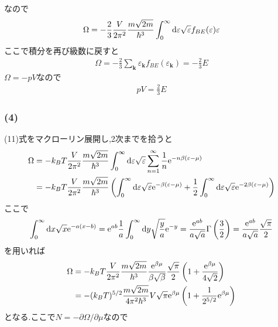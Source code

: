なので
\begin{align}
  \Omega=-\frac{2}{3}\frac{V}{2\pi^2}\frac{m\sqrt{2m}}{\hbar^3}\int_0^\infty{\rm d}\varepsilon\sqrt{\varepsilon}f_{BE}(\varepsilon)\varepsilon
\end{align}
ここで積分を再び級数に戻すと
\begin{align}
  \Omega=-\frac{2}{3}\sum_{\bm k}\varepsilon_{\bm k}f_{BE}(\varepsilon_{\bm k})=-\frac{2}{3}E
\end{align}
$\Omega=-pV$なので
\begin{align}
  pV=\frac{2}{3}E
\end{align}
\subsubsection*{(4)}
(11)式をマクローリン展開し,2次までを拾うと
\begin{align}
  \begin{split}
    \Omega&=-k_BT\frac{V}{2\pi^2}\frac{m\sqrt{2m}}{\hbar^3}\int^\infty_0{\rm d}\varepsilon\sqrt{\varepsilon}\sum_{n=1}^\infty\frac{1}{n}{\rm e}^{-n\beta(\varepsilon-\mu)}\\
    &=-k_BT\frac{V}{2\pi^2}\frac{m\sqrt{2m}}{\hbar^3}\left(\int_0^\infty{\rm d}\varepsilon\sqrt{\varepsilon}{\rm e}^{-\beta(\varepsilon-\mu)}+\frac{1}{2}\int_0^\infty{\rm d}\varepsilon\sqrt{\varepsilon}{\rm e}^{-2\beta(\varepsilon-\mu)}\right)
  \end{split}
\end{align}
ここで
\begin{align}
  \begin{split}
    \int_0^\infty{\rm d}x\sqrt{x}{\rm e}^{-a(x-b)}={\rm e}^{ab}\frac{1}{a}\int_0^\infty{\rm d}y\sqrt{\frac{y}{a}}{\rm e}^{-y}=\frac{{\rm e}^{ab}}{a\sqrt{a}}\Gamma\left(\frac{3}{2}\right)=\frac{{\rm e}^{ab}}{a\sqrt{a}}\frac{\sqrt{\pi}}{2}
  \end{split}
\end{align}
を用いれば
\begin{align}
  \begin{split}
    \Omega&=-k_BT\frac{V}{2\pi^2}\frac{m\sqrt{2m}}{\hbar^3}\frac{{\rm e}^{\beta\mu}}{\beta\sqrt{\beta}}\frac{\sqrt{\pi}}{2}\left(1+\frac{{\rm e}^{\beta\mu}}{4\sqrt{2}}\right)\\
    &=-(k_BT)^{5/2}\frac{m\sqrt{2m}}{4\pi^2\hbar^3}V\sqrt{\pi}{\rm e}^{\beta\mu}\left(1+\frac{1}{2^{5/2}}{\rm e}^{\beta\mu}\right)
  \end{split}
\end{align}
となる.ここで$N=-\partial\Omega/\partial\mu$なので
